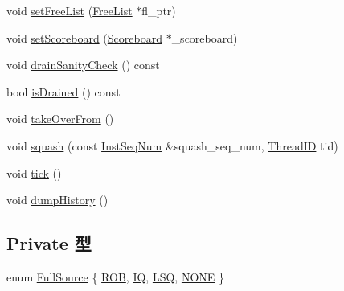 \begin{DoxyCompactItemize}
\item 
void \hyperlink{classDefaultRename_a2d3550e87cb180105600dfaefcf83358}{setFreeList} (\hyperlink{classDefaultRename_ab784c356bacd490590fba42443e0f786}{FreeList} $\ast$fl\_\-ptr)
\item 
void \hyperlink{classDefaultRename_a0b50ac63f22501d5c688294031615b6e}{setScoreboard} (\hyperlink{classScoreboard}{Scoreboard} $\ast$\_\-scoreboard)
\item 
void \hyperlink{classDefaultRename_a0240eb42fa57fe5d3788093f62b77347}{drainSanityCheck} () const 
\item 
bool \hyperlink{classDefaultRename_adf5473c18a3d7c1e88c4a2072bce5526}{isDrained} () const 
\item 
void \hyperlink{classDefaultRename_a8674059ce345e23aac5086b2c3e24a43}{takeOverFrom} ()
\item 
void \hyperlink{classDefaultRename_aa896d7ff2c9da1e6e96d46ab4580ec9d}{squash} (const \hyperlink{inst__seq_8hh_a258d93d98edaedee089435c19ea2ea2e}{InstSeqNum} \&squash\_\-seq\_\-num, \hyperlink{base_2types_8hh_ab39b1a4f9dad884694c7a74ed69e6a6b}{ThreadID} tid)
\item 
void \hyperlink{classDefaultRename_a873dd91783f9efb4a590aded1f70d6b0}{tick} ()
\item 
void \hyperlink{classDefaultRename_a697961c6f132b511d2921ed9feed80fa}{dumpHistory} ()
\end{DoxyCompactItemize}
\subsection*{Private 型}
\begin{DoxyCompactItemize}
\item 
enum \hyperlink{classDefaultRename_ae3b7ca6b65ac494b86816b5f1dd24e96}{FullSource} \{ \hyperlink{classDefaultRename_ae3b7ca6b65ac494b86816b5f1dd24e96a5040344e9d10f27af23c05c21c5e284f}{ROB}, 
\hyperlink{classDefaultRename_ae3b7ca6b65ac494b86816b5f1dd24e96a7608065caa4249ff47a58c32d6f3c531}{IQ}, 
\hyperlink{classDefaultRename_ae3b7ca6b65ac494b86816b5f1dd24e96a4cc572b5087c4e67104941ee638a8512}{LSQ}, 
\hyperlink{classDefaultRename_ae3b7ca6b65ac494b86816b5f1dd24e96ac157bdf0b85a40d2619cbc8bc1ae5fe2}{NONE}
 \}
\end{DoxyCompactItemize}
